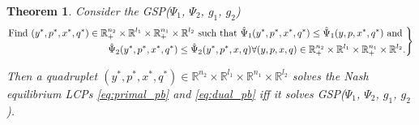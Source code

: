 \documentclass{article} %
\newtheorem{theorem}{Theorem} \newtheorem{lemma}[theorem]{Lemma}
\begin{document}
\begin{theorem}
Consider the GSP($\Psi_1$, $\Psi_2$, $g_1$, $g_2$)
  \begin{eqnarray}
    \left.
    \begin{aligned}
      \text{Find }(y^*,p^*, x^*, q^*) \in \mathbb{R}^{n_2}_+
  \times \mathbb{R}^{l_1} \times \mathbb{R}^{n_1}_+ \times
  \mathbb{R}^{l_2}\text{ such that }\hat{\Psi}_1(y^*, p^*, x^*, q^*) \le \hat{\Psi}_1(y, p, x^*, q^*)
      \text{ and }\\
      \hspace{.5em}\hat{\Psi}_2(y^*, p^*, x^*, q^*) \le
      \hat{\Psi}_2(y^*, p^*, x, q)
        \forall (y,p, x, q) \in \mathbb{R}^{n_2}_+
      \times \mathbb{R}^{l_1} \times \mathbb{R}^{n_1}_+ \times
      \mathbb{R}^{l_2}.
    \end{aligned}
    \right\}
    \label{eq:unconstrained_pb}
  \end{eqnarray}
  \label{thm:pd}

  Then a quadruplet $(y^*,p^*, x^*, q^*) \in \mathbb{R}^{n_2}
  \times \mathbb{R}^{l_1} \times \mathbb{R}^{n_1} \times
  \mathbb{R}^{l_2}$ solves the Nash equilibrium LCPs
  \eqref{eq:primal_pb} and \eqref{eq:dual_pb} iff it solves
  GSP($\Psi_1$, $\Psi_2$, $g_1$, $g_2$).
  \label{thm:pd}
\end{theorem}
\end{document}
